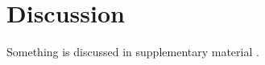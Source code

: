 \section{Discussion}
\label{sec:discussion}

Something is discussed in supplementary material \cite{supplementary}.

